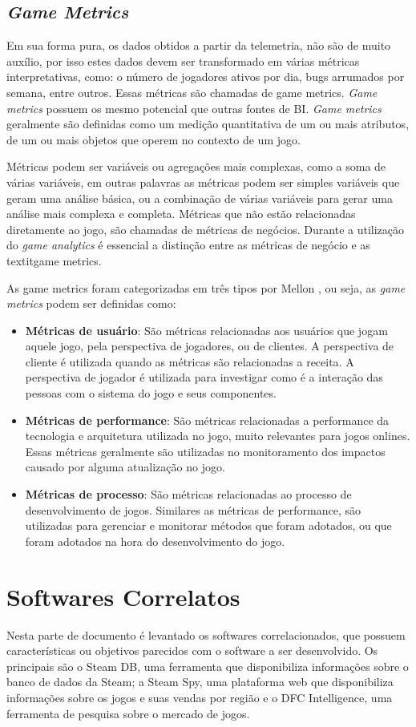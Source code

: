 \subsection{\textit{Game Metrics}}
Em sua forma pura, os dados obtidos a partir da telemetria, não são de muito auxílio, por isso estes dados devem ser transformado em várias métricas interpretativas, como: o número de jogadores ativos por dia, bugs arrumados por semana, entre outros. Essas métricas são chamadas de game metrics. \textit{Game metrics} possuem os mesmo potencial que outras fontes de BI. \textit{Game metrics} geralmente são definidas como um medição quantitativa de um ou mais atributos, de um ou mais objetos que operem no contexto de um jogo.

Métricas podem ser variáveis ou  agregações mais complexas, como a soma de várias variáveis, em outras palavras as métricas podem ser simples variáveis que geram uma análise básica, ou a combinação de várias variáveis para gerar uma análise mais complexa e completa. Métricas que não estão relacionadas diretamente ao jogo, são chamadas de métricas de negócios. Durante a utilização do \textit{game analytics} é essencial a distinção entre as métricas de negócio e as textit{game metrics}.

As game metrics foram categorizadas em três tipos por Mellon \cite{game_metrics}, ou seja, as \textit{game metrics} podem ser definidas como:
\begin{itemize}
	\item \textbf{Métricas de usuário}: São métricas relacionadas aos usuários que jogam aquele jogo, pela perspectiva de jogadores, ou de clientes. A perspectiva de cliente é utilizada quando as métricas são relacionadas a receita. A perspectiva de jogador é utilizada para investigar como é a interação das pessoas com o sistema do jogo e seus componentes.
	\item \textbf{Métricas de performance}: São métricas relacionadas a performance da tecnologia e arquitetura utilizada no jogo, muito relevantes para jogos onlines. Essas métricas geralmente são utilizadas no monitoramento dos impactos causado por alguma atualização no jogo.
	\item \textbf{Métricas de processo}: São métricas relacionadas ao processo de desenvolvimento de jogos. Similares as métricas de performance, são utilizadas para gerenciar e monitorar métodos que foram adotados, ou que foram adotados na hora do desenvolvimento do jogo. 
\end{itemize}
\section{Softwares Correlatos}
Nesta parte de documento é levantado os softwares correlacionados, que possuem características ou objetivos parecidos com o software a ser desenvolvido. Os principais são o Steam DB, uma ferramenta que disponibiliza informações sobre o banco de dados da Steam; a Steam Spy, uma plataforma web que disponibiliza informações sobre os jogos e suas vendas por região e o DFC Intelligence, uma ferramenta de pesquisa sobre o mercado de jogos.
